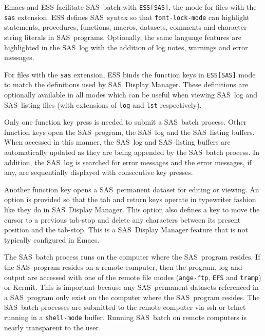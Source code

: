 \documentclass{article}
\newcommand*{\SAS}{\textsc{SAS}}
\newcommand{\stexttt}[1]{{\small\texttt{#1}}}
\newenvironment{Comment}{\begin{quote}\small\itshape }{\end{quote}}
\begin{document}
Emacs and ESS facilitate \SAS\ batch with \stexttt{ESS[SAS]}, the mode 
for files with the \stexttt{sas} extension.  ESS defines \SAS\ syntax so that
\stexttt{font-lock-mode} can highlight statements, procedures,
functions, macros, datasets, comments and character string literals in
\SAS\ programs.  Optionally, the same language features are
highlighted in the \SAS\ log with the addition of log notes, warnings
and error messages.

For files with the \stexttt{sas} extension, ESS binds the function
keys in \stexttt{ESS[SAS]} mode to match the definitions used by \SAS\ 
Display Manager.  These definitions are optionally available in all
modes which can be useful when viewing \SAS\ log and \SAS\ listing
files (with extensions of \stexttt{log} and \stexttt{lst}
respectively).

Only one function key press is needed to submit a \SAS\ batch process.
Other function keys open the \SAS\ program, the \SAS\ log and the
\SAS\ listing buffers.  When accessed in this manner, the \SAS\ log and 
\SAS\ listing buffers are automatically updated as they are being appended 
by the \SAS\ batch process.  In addition, the \SAS\ log is searched for error
messages and the error messages, if any, are sequentially displayed
with consecutive key presses.

Another function key opens a \SAS\ permanent dataset for editing or
viewing.  An option is provided so that the tab and return keys
operate in typewriter fashion like they do in \SAS\ Display Manager.
This option also defines a key to move the cursor to a previous
tab-stop and delete any characters between its present position and
the tab-stop.  This is a \SAS\ Display Manager feature that is not
typically configured in Emacs.

The \SAS\ batch process runs on the computer where the \SAS\ program
resides.  If the \SAS\ program resides on a remote computer, then the
program, log and output are accessed with one of the remote file modes
(\stexttt{ange-ftp}, \stexttt{EFS} and \stexttt{tramp}) or Kermit.
This is important because any \SAS\ permanent datasets referenced in a
\SAS\ program only exist on the computer where the \SAS\ program
resides.  The \SAS\ batch processes are submitted to the remote
computer via ssh or telnet running in a \stexttt{shell-mode} buffer.
Running \SAS\ batch on remote computers is nearly transparent to the user.

\end{document}
